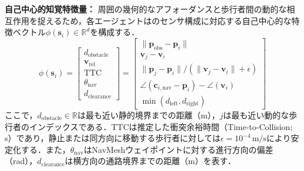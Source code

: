 \documentclass{sice-si}
\begin{document}
\textbf{自己中心的知覚特徴量：}
周囲の幾何的なアフォーダンスと歩行者間の動的な相互作用を捉えるため，各エージェントはのセンサ構成に対応する自己中心的な特徴ベクトル$\phi(\mathbf{s}_i) \in \mathbb{R}^d$を構成する．
\begin{equation}
    \phi(\mathbf{s}_i) = \begin{bmatrix}
    d_{\text{obstacle}} \\
    \mathbf{v}_{\text{rel}} \\
    \text{TTC} \\
    \theta_{\text{nav}} \\
    d_{\text{clearance}}
    \end{bmatrix} = \begin{bmatrix}
    \|\mathbf{p}_{\text{obs}} - \mathbf{p}_i\| \\
    \mathbf{v}_j - \mathbf{v}_i \\
    \|\mathbf{p}_j - \mathbf{p}_i\| / (\|\mathbf{v}_j - \mathbf{v}_i\| + \epsilon) \\
    \angle(\mathbf{c}_{i, \text{nav}} - \mathbf{p}_i) - \angle(\mathbf{v}_i) \\
    \min(d_{\text{left}}, d_{\text{right}})
    \end{bmatrix}
\end{equation}
ここで，$d_{\text{obstacle}} \in \mathbb{R}$は最も近い静的境界までの距離（m），$j$は最も近い動的な歩行者のインデックスである．$\text{TTC}$は推定した衝突余裕時間（Time-to-Collision; s）であり，静止または同方向に移動する歩行者に対しては$\epsilon = 10^{-4}\,\text{m/s}$により安定化する．また，$\theta_{\text{nav}}$はNavMeshウェイポイントに対する進行方向の偏差（rad），$d_{\text{clearance}}$は横方向の通路境界までの距離（m）を表す．
\end{document}
